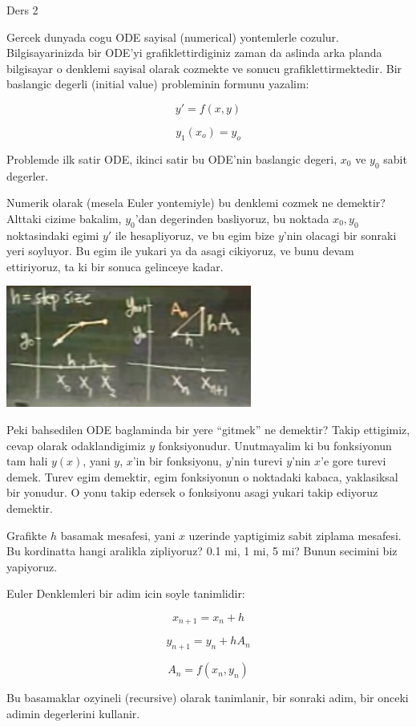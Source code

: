 \documentclass[12pt,fleqn]{article}\usepackage{../common}
\begin{document}
Ders 2

Gercek dunyada cogu ODE sayisal (numerical) yontemlerle
cozulur. Bilgisayarinizda bir ODE'yi grafiklettirdiginiz zaman da aslinda arka
planda bilgisayar o denklemi sayisal olarak cozmekte ve sonucu
grafiklettirmektedir. Bir baslangic degerli (initial value) probleminin formunu
yazalim: 

\[ y' = f(x,y) \]

\[ y_1(x_o) = y_o \]

Problemde ilk satir ODE, ikinci satir bu ODE'nin baslangic degeri, $x_0$ ve $y_0$
sabit degerler. 

Numerik olarak (mesela Euler yontemiyle) bu denklemi cozmek ne demektir? Alttaki
cizime bakalim, $y_0$'dan degerinden basliyoruz, bu noktada $x_0,y_0$
noktasindaki egimi $y'$ ile hesapliyoruz, ve bu egim bize $y$'nin olacagi bir
sonraki yeri soyluyor. Bu egim ile yukari ya da asagi cikiyoruz, ve bunu devam
ettiriyoruz, ta ki bir sonuca gelinceye kadar.

\includegraphics[height=4cm]{2_1.png}

Peki bahsedilen ODE baglaminda bir yere ``gitmek'' ne demektir? Takip ettigimiz,
cevap olarak odaklandigimiz $y$ fonksiyonudur. Unutmayalim ki bu fonksiyonun tam
hali $y(x)$, yani $y$, $x$'in bir fonksiyonu, $y$'nin turevi $y$'nin $x$'e gore
turevi demek. Turev egim demektir, egim fonksiyonun o noktadaki kabaca,
yaklasiksal bir yonudur. O yonu takip edersek o fonksiyonu asagi yukari takip
ediyoruz demektir.

Grafikte $h$ basamak mesafesi, yani $x$ uzerinde yaptigimiz sabit ziplama
mesafesi. Bu kordinatta hangi aralikla zipliyoruz? 0.1 mi, 1 mi, 5 mi? Bunun
secimini biz yapiyoruz. 

Euler Denklemleri bir adim icin soyle tanimlidir:

\[ x_{n+1} = x_n + h \]

\[ y_{n+1} = y_n + hA_n \]

\[ A_n = f(x_n, y_n) \]

Bu basamaklar ozyineli (recursive) olarak tanimlanir, bir sonraki adim, bir
onceki adimin degerlerini kullanir. 
\end{document}
